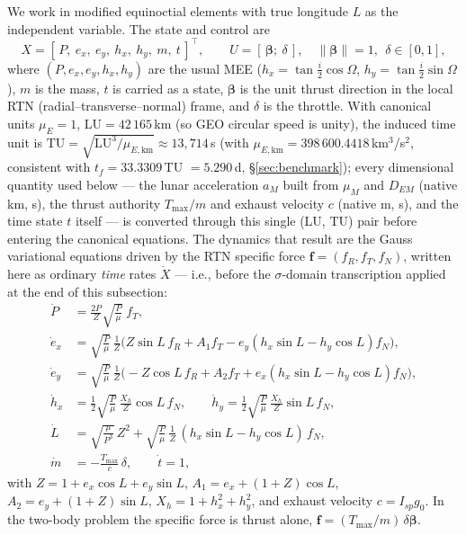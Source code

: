 \documentclass[11pt]{article}
\newcommand{\vect}[1]{\bm{#1}}
\begin{document}
We work in modified equinoctial elements with true longitude $L$ as the
independent variable. The state and control are
\[
X = \left[\,P,\ e_x,\ e_y,\ h_x,\ h_y,\ m,\ t\,\right]^{\!\top},
\qquad
U = \left[\,\vect{\beta};\ \delta\,\right],
\quad \lVert \vect{\beta} \rVert = 1,\ \ \delta \in [0,1],
\]
where $(P, e_x, e_y, h_x, h_y)$ are the usual MEE
($h_x = \tan\tfrac{i}{2}\cos\Omega$, $h_y = \tan\tfrac{i}{2}\sin\Omega$),
$m$ is the mass, $t$ is carried as a state, $\vect{\beta}$ is the unit
thrust direction in the local RTN (radial--transverse--normal) frame, and
$\delta$ is the throttle. With canonical units $\mu_E = 1$,
$\mathrm{LU} = 42\,165$\,km (so GEO circular speed is unity), the induced
time unit is $\mathrm{TU} = \sqrt{\mathrm{LU}^3/\mu_{E,\mathrm{km}}}
\approx 13{,}714$\,s (with $\mu_{E,\mathrm{km}} = 398\,600.4418$\,km$^3$/s$^2$,
consistent with $t_f = 33.3309$\,TU $= 5.290$\,d, \S\ref{sec:benchmark});
every dimensional quantity used below --- the lunar acceleration $a_M$
built from $\mu_M$ and $D_{EM}$ (native km, s), the thrust authority
$T_{\max}/m$ and exhaust velocity $c$ (native m, s), and the time state
$t$ itself --- is converted through this single (LU, TU) pair before
entering the canonical equations. The dynamics that result are the Gauss
variational equations driven by the RTN specific force
$\vect{f} = (f_R, f_T, f_N)$, written here as ordinary \emph{time} rates
$\dot X$ --- i.e., before the $\sigma$-domain transcription applied at the
end of this subsection:
\begin{equation}
\label{eq:gauss}
\begin{aligned}
\dot P   &= \frac{2P}{Z}\sqrt{\tfrac{P}{\mu}}\; f_T, \\
\dot e_x &= \sqrt{\tfrac{P}{\mu}}\,\tfrac{1}{Z}
            \bigl( Z \sin L\, f_R + A_1 f_T - e_y (h_x \sin L - h_y \cos L) f_N \bigr), \\
\dot e_y &= \sqrt{\tfrac{P}{\mu}}\,\tfrac{1}{Z}
            \bigl( -Z \cos L\, f_R + A_2 f_T + e_x (h_x \sin L - h_y \cos L) f_N \bigr), \\
\dot h_x &= \tfrac{1}{2}\sqrt{\tfrac{P}{\mu}}\,\tfrac{X_h}{Z} \cos L\, f_N, \qquad
\dot h_y = \tfrac{1}{2}\sqrt{\tfrac{P}{\mu}}\,\tfrac{X_h}{Z} \sin L\, f_N, \\
\dot L   &= \sqrt{\tfrac{\mu}{P^3}}\,Z^2
            + \sqrt{\tfrac{P}{\mu}}\,\tfrac{1}{Z}\,(h_x \sin L - h_y \cos L)\, f_N, \\
\dot m   &= -\tfrac{T_{\max}}{c}\,\delta, \qquad \dot t = 1,
\end{aligned}
\end{equation}
with $Z = 1 + e_x\cos L + e_y \sin L$, $A_1 = e_x + (1{+}Z)\cos L$,
$A_2 = e_y + (1{+}Z)\sin L$, $X_h = 1 + h_x^2 + h_y^2$, and exhaust
velocity $c = I_{sp} g_0$. In the two-body problem the specific force is
thrust alone, $\vect{f} = (T_{\max}/m)\,\delta\vect{\beta}$.
\end{document}
